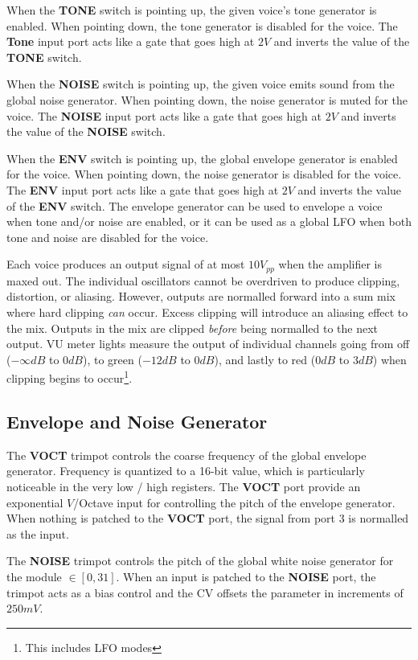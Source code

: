 \documentclass[12pt,letter]{article}
\begin{document}
When the \textbf{TONE} switch is pointing up, the given voice's tone generator is enabled. When pointing down, the tone generator is disabled for the voice. The \textbf{Tone} input port acts like a gate that goes high at $2V$ and inverts the value of the \textbf{TONE} switch.

When the \textbf{NOISE} switch is pointing up, the given voice emits sound from the global noise generator. When pointing down, the noise generator is muted for the voice. The \textbf{NOISE} input port acts like a gate that goes high at $2V$ and inverts the value of the \textbf{NOISE} switch.

When the \textbf{ENV} switch is pointing up, the global envelope generator is enabled for the voice. When pointing down, the noise generator is disabled for the voice. The \textbf{ENV} input port acts like a gate that goes high at $2V$ and inverts the value of the \textbf{ENV} switch. The envelope generator can be used to envelope a voice when tone and/or noise are enabled, or it can be used as a global LFO when both tone and noise are disabled for the voice.

Each voice produces an output signal of at most $10V_{pp}$ when the amplifier is maxed out. The individual oscillators cannot be overdriven to produce clipping, distortion, or aliasing. However, outputs are normalled forward into a sum mix where hard clipping \textit{can} occur. Excess clipping will introduce an aliasing effect to the mix. Outputs in the mix are clipped \textit{before} being normalled to the next output. VU meter lights measure the output of individual channels going from off ($-\infty dB$ to $0dB$), to green ($-12dB$ to $0dB$), and lastly to red ($0dB$ to $3dB$) when clipping begins to occur\footnote{This includes LFO modes}.

\subsection{Envelope and Noise Generator}

The \textbf{VOCT} trimpot controls the coarse frequency of the global envelope generator. Frequency is quantized to a 16-bit value, which is particularly noticeable in the very low / high registers. The \textbf{VOCT} port provide an exponential $V$/Octave input for controlling the pitch of the envelope generator. When nothing is patched to the \textbf{VOCT} port, the signal from port 3 is normalled as the input.

The \textbf{NOISE} trimpot controls the pitch of the global white noise generator for the module $\in [0, 31]$. When an input is patched to the \textbf{NOISE} port, the trimpot acts as a bias control and the CV offsets the parameter in increments of $250mV$.
\end{document}
